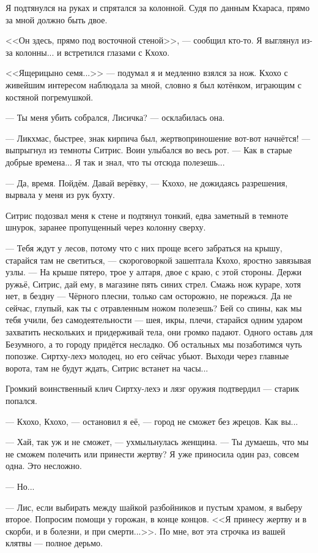 Я подтянулся на руках и спрятался за колонной.
Судя по данным Кхараса, прямо за мной должно быть двое.

<<Он здесь, прямо под восточной стеной>>, --- сообщил кто-то.
Я выглянул из-за колонны... и встретился глазами с Кхохо.

<<Ящерицыно семя...>> --- подумал я и медленно взялся за нож.
Кхохо с живейшим интересом наблюдала за мной, словно я был котёнком, играющим с костяной погремушкой.

--- Ты меня убить собрался, Лисичка? --- осклабилась она.

--- Ликхмас, быстрее, знак кирпича был, жертвоприношение вот-вот начнётся! --- выпрыгнул из темноты Ситрис.
Воин улыбался во весь рот.
--- Как в старые добрые времена...
Я так и знал, что ты отсюда полезешь...

--- Да, время.
Пойдём.
Давай верёвку, --- Кхохо, не дожидаясь разрешения, вырвала у меня из рук бухту.

Ситрис подозвал меня к стене и подтянул тонкий, едва заметный в темноте шнурок, заранее пропущенный через колонну сверху.

--- Тебя ждут у лесов, потому что с них проще всего забраться на крышу, старайся там не светиться, --- скороговоркой зашептала Кхохо, яростно завязывая узлы.
--- На крыше пятеро, трое у алтаря, двое с краю, с этой стороны.
Держи ружьё, Ситрис, дай ему, в магазине пять синих стрел.
Смажь нож кураре, хотя нет, в бездну --- Чёрного плесни, только сам осторожно, не порежься.
Да не сейчас, глупый, как ты с отравленным ножом полезешь?
Бей со спины, как мы тебя учили, без самодеятельности --- шея, икры, плечи, старайся одним ударом захватить нескольких и придерживай тела, они громко падают.
Одного оставь для Безумного, а то городу придётся несладко.
Об остальных мы позаботимся чуть попозже.
Сиртху-лехэ молодец, но его сейчас убьют.
Выходи через главные ворота, там не будут ждать, Ситрис встанет на часы...

Громкий воинственный клич Сиртху-лехэ и лязг оружия подтвердил --- старик попался.

--- Кхохо, Кхохо, --- остановил я её, --- город не сможет без жрецов.
Как вы...

--- Хай, так уж и не сможет, --- ухмыльнулась женщина.
--- Ты думаешь, что мы не сможем полечить или принести жертву?
Я уже приносила один раз, совсем одна.
Это несложно.

--- Но...

--- Лис, если выбирать между шайкой разбойников и пустым храмом, я выберу второе.
Попросим помощи у горожан, в конце концов.
<<Я принесу жертву и в скорби, и в болезни, и при смерти...>>.
По мне, вот эта строчка из вашей клятвы --- полное дерьмо.

